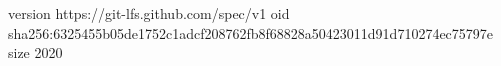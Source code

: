 version https://git-lfs.github.com/spec/v1
oid sha256:6325455b05de1752c1adcf208762fb8f68828a50423011d91d710274ec75797e
size 2020
